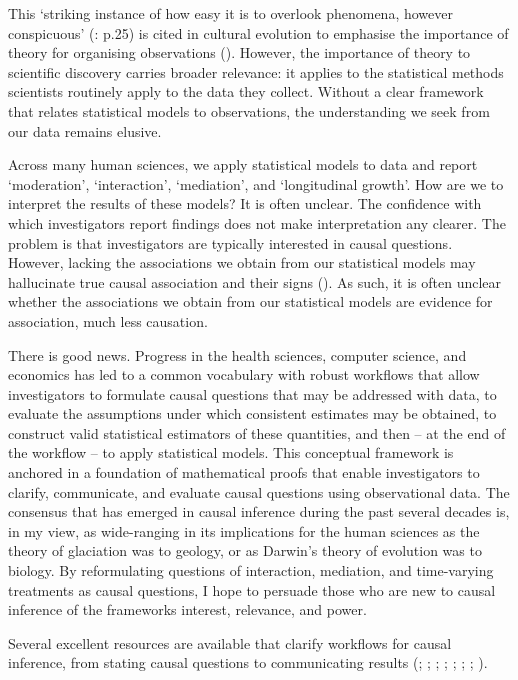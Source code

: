 \documentclass[
  single column]{article}
\begin{document}
This `striking instance of how easy it is to overlook phenomena, however
conspicuous' (: p.25) is cited
in cultural evolution to emphasise the importance of theory for
organising observations (). However, the importance of theory to scientific discovery
carries broader relevance: it applies to the statistical methods
scientists routinely apply to the data they collect. Without a clear
framework that relates statistical models to observations, the
understanding we seek from our data remains elusive.

Across many human sciences, we apply statistical models to data and
report `moderation', `interaction', `mediation', and `longitudinal
growth'. How are we to interpret the results of these models? It is
often unclear. The confidence with which investigators report findings
does not make interpretation any clearer. The problem is that
investigators are typically interested in causal questions. However,
lacking the associations we obtain from our statistical models may
hallucinate true causal association and their signs
(). As such,
it is often unclear whether the associations we obtain from our
statistical models are evidence for association, much less causation.

There is good news. Progress in the health sciences, computer science,
and economics has led to a common vocabulary with robust workflows that
allow investigators to formulate causal questions that may be addressed
with data, to evaluate the assumptions under which consistent estimates
may be obtained, to construct valid statistical estimators of these
quantities, and then -- at the end of the workflow -- to apply
statistical models. This conceptual framework is anchored in a
foundation of mathematical proofs that enable investigators to clarify,
communicate, and evaluate causal questions using observational data. The
consensus that has emerged in causal inference during the past several
decades is, in my view, as wide-ranging in its implications for the
human sciences as the theory of glaciation was to geology, or as
Darwin's theory of evolution was to biology. By reformulating questions
of interaction, mediation, and time-varying treatments as causal
questions, I hope to persuade those who are new to causal inference of
the frameworks interest, relevance, and power.

Several excellent resources are available that clarify workflows for
causal inference, from stating causal questions to communicating results
(;
;
;
;
;
; ; ).
\end{document}
